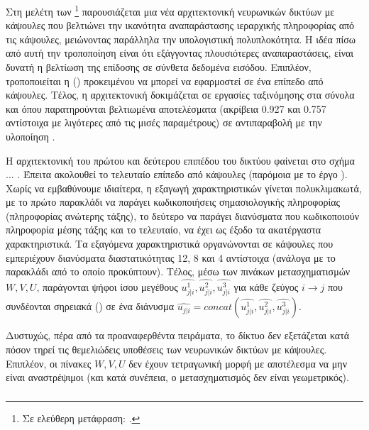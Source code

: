 \subsubsection{}

Στη μελέτη των  \footnote{Σε ελεύθερη μετάφραση: .} \cite{xiang2018ms} παρουσιάζεται μια νέα αρχιτεκτονική νευρωνικών δικτύων με κάψουλες που βελτιώνει την ικανότητα αναπαράστασης ιεραρχικής πληροφορίας από τις κάψουλες, μειώνοντας παράλληλα την υπολογιστική πολυπλοκότητα. Η ιδέα πίσω από αυτή την τροποποίηση είναι ότι εξάγγοντας πλουσιότερες αναπαραστάσεις, είναι δυνατή η βελτίωση της επίδοσης σε σύνθετα δεδομένα εισόδου. Επιπλέον, τροποποιείται η  () προκειμένου να μπορεί να εφαρμοστεί σε ένα επίπεδο από κάψουλες. Τέλος, η αρχιτεκτονική δοκιμάζεται σε εργασίες ταξινόμησης στα σύνολα  και  όπου παρατηρούνται βελτιωμένα αποτελέσματα (ακρίβεια 0.927 και 0.757 αντίστοιχα με λιγότερες από τις μισές παραμέτρους) σε αντιπαραβολή με την υλοποίηση \cite{sabour2017dynamic}.\par

Η αρχιτεκτονική του πρώτου και δεύτερου επιπέδου του δικτύου φαίνεται στο σχήμα ...  . Έπειτα ακολουθεί το τελευταίο επίπεδο από κάψουλες (παρόμοια με το έργο \cite{sabour2017dynamic}). Χωρίς να εμβαθύνουμε ιδιαίτερα, η εξαγωγή χαρακτηριστικών γίνεται πολυκλιμακωτά, με το πρώτο παρακλάδι να παράγει κωδικοποιήσεις σημασιολογικής πληροφορίας (πληροφορίας ανώτερης τάξης), το δεύτερο να παράγει διανύσματα που κωδικοποιούν πληροφορία μέσης τάξης και το τελευταίο, να έχει ως έξοδο τα ακατέργαστα χαρακτηριστικά. Τα εξαγόμενα χαρακτηριστικά οργανώνονται σε κάψουλες που εμπεριέχουν διανύσματα διαστατικότητας 12, 8 και 4 αντίστοιχα (ανάλογα με το παρακλάδι από το οποίο προκύπτουν). Τέλος, μέσω των πινάκων μετασχηματισμών $W, V, U$, παράγονται ψήφοι ίσου μεγέθους  $\hat{u^1_{j|i}}, \hat{u^2_{j|i}}, \hat{u^3_{j|i}}$ για κάθε ζεύγος $i \rightarrow j$ που συνδέονται σηρειακά () σε ένα διάνυσμα $\hat{u_{j|i}} = concat(\hat{u^1_{j|i}}, \hat{u^2_{j|i}}, \hat{u^3_{j|i}})$.\par

Δυστυχώς, πέρα από τα προαναφερθέντα πειράματα, το δίκτυο δεν εξετάζεται κατά πόσον τηρεί τις θεμελιώδεις υποθέσεις των νευρωνικών δικτύων με κάψουλες. Επιπλέον, οι πίνακες $W, V, U$ δεν έχουν τετραγωνική μορφή με αποτέλεσμα να μην είναι αναστρέψιμοι (και κατά συνέπεια, ο μετασχηματισμός δεν είναι γεωμετρικός).

\subsubsection{}